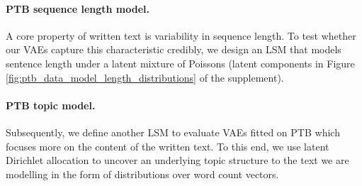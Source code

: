 
\paragraph{PTB sequence length model.}

A core property of written text is variability in sequence length. To test whether our VAEs capture this characteristic credibly, we design an LSM that models sentence length under a latent mixture of Poissons (latent components in Figure \ref{fig:ptb_data_model_length_distributions} of the supplement). %


\paragraph{PTB topic model.}

Subsequently, we define another LSM to evaluate VAEs fitted on PTB which focuses more on the content of the written text. To this end, we use latent Dirichlet allocation \cite[LDA;][]{blei2003lda} to uncover an underlying topic structure to the text we are modelling in the form of distributions over word count vectors. %



